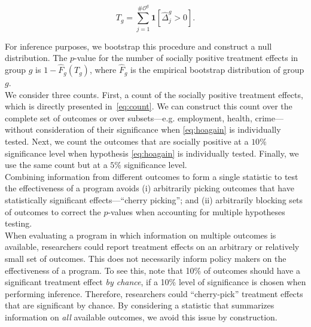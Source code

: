\begin{equation}
T_{g} = \sum _{j=1}^{\# \mathcal{O}^g} \mathbf{1} \left[ \widehat{\Delta}_{j}^{g} > 0\right]. \label{eq:count}
\end{equation} 

\noindent For inference purposes, we bootstrap this procedure and construct a null distribution. The $p$-value for the number of socially positive treatment effects in group $g$ is $1 - \widehat{F}_{g} \left( T_{g} \right)$, where $ \widehat{F}_{g}$ is the empirical bootstrap distribution of group $g$. \\

\noindent We consider three counts. First, a count of the socially positive treatment effects, which is directly presented in~\eqref{eq:count}. We can construct this count over the complete set of outcomes or over subsets---e.g. employment, health, crime---without consideration of their significance when \eqref{eq:hoagain} is individually tested. Next, we count the outcomes that are  socially positive at a $10\%$ significance level when hypothesis \eqref{eq:hoagain} is individually tested. Finally, we use the same count but at a $5\%$ significance level.\\

\noindent Combining information from different outcomes to form a single statistic to test the effectiveness of a program avoids (i) arbitrarily picking outcomes that have statistically significant effects---``cherry picking''; and (ii) arbitrarily blocking sets of outcomes to correct the $p$-values when accounting for multiple hypotheses testing.\\

\noindent When evaluating a program in which information on multiple outcomes is available, researchers could report treatment effects on an arbitrary or relatively small set of outcomes. This does not necessarily inform policy makers on the effectiveness of a program. To see this, note that 10\% of outcomes should have a significant treatment effect \textit{by chance}, if a 10\% level of significance is chosen when performing inference. Therefore, researchers could ``cherry-pick'' treatment effects that are significant by chance. By considering a statistic that summarizes information on \emph{all} available outcomes, we avoid this issue by construction.\\

